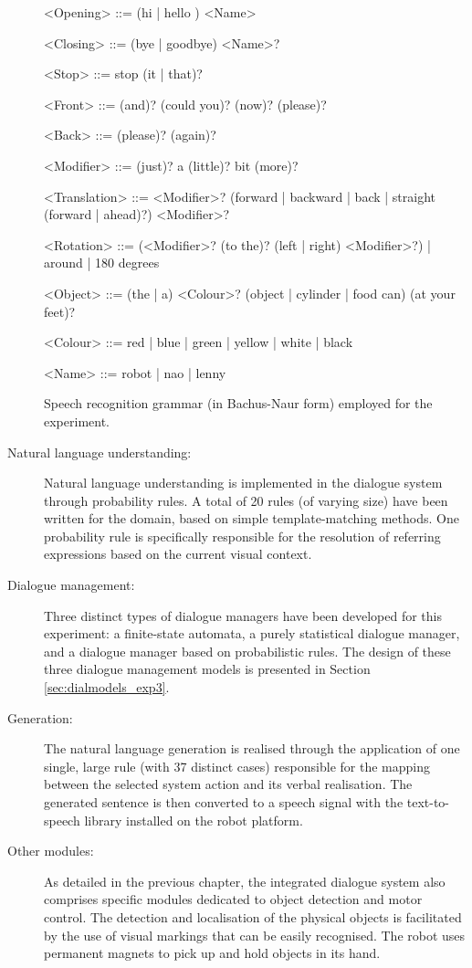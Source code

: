 \begin{description}
\begin{table}[p!]
\begin{grammar}
<Opening> ::= (hi | hello ) <Name>

<Closing> ::= (bye | goodbye) <Name>?

<Stop> ::= stop (it | that)?
 
<Front> ::= (and)? (could you)? (now)? (please)?

<Back> ::= (please)? (again)?

<Modifier> ::= (just)? a (little)? bit (more)? 

<Translation> ::= <Modifier>? (forward | backward | back | straight (forward | ahead)?) <Modifier>?

<Rotation> ::= (<Modifier>? (to the)? (left | right) <Modifier>?) | around | 180 degrees

<Object> ::= (the | a) <Colour>? (object | cylinder | food can) (at your feet)? 

<Colour> ::= red | blue | green | yellow | white | black 

<Name> ::= robot | nao | lenny

\end{grammar}
\caption{Speech recognition grammar (in Bachus-Naur form) employed for the experiment.}
\label{table:asr}
\end{table}

\item[Natural language understanding: ] Natural language understanding is implemented in the dialogue system through probability rules.  A total of 20 rules (of varying size) have been written for the domain, based on simple template-matching methods. One probability rule is specifically responsible for the resolution of referring expressions based on the current visual context. 

\item[Dialogue management: ] Three distinct types of dialogue managers have been developed for this experiment: a finite-state automata, a purely statistical dialogue manager, and a dialogue manager based on probabilistic rules.  The design of these three dialogue management models is presented in Section \ref{sec:dialmodels_exp3}. 

\item[Generation: ] The natural language generation is realised through the application of one single, large rule (with 37 distinct cases) responsible for the mapping between the selected system action and its verbal realisation. The generated sentence is then converted to a speech signal with the text-to-speech library installed on the robot platform.

\item [Other modules: ] As detailed in the previous chapter, the integrated dialogue system also comprises specific modules dedicated to object detection and motor control.  The detection and localisation of the physical objects is facilitated by the use of visual markings that can be easily recognised.  The robot uses permanent magnets to pick up and hold objects in its hand. 

\end{description}


